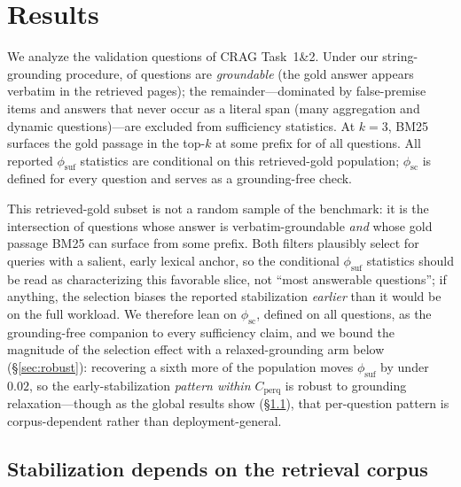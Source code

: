 \section{Results}
We analyze the \nSplitZero{} validation questions of CRAG Task~1\&2. Under our
string-grounding procedure, \nGroundPct{} of questions are \emph{groundable} (the
gold answer appears verbatim in the retrieved pages); the remainder---dominated by
false-premise items and answers that never occur as a literal span (many
aggregation and dynamic questions)---are excluded from sufficiency statistics. At
$k{=}3$, BM25 surfaces the gold passage in the top-$k$ at some prefix for
\nRetrPct{} of all questions. All reported $\phi_{\mathrm{suf}}$ statistics are
conditional on this retrieved-gold population; $\phi_{\mathrm{sc}}$ is defined for
every question and serves as a grounding-free check.

This retrieved-gold subset is not a random sample of the benchmark: it is the
intersection of questions whose answer is verbatim-groundable \emph{and} whose gold
passage BM25 can surface from some prefix. Both filters plausibly select for
queries with a salient, early lexical anchor, so the conditional
$\phi_{\mathrm{suf}}$ statistics should be read as characterizing this favorable
slice, not ``most answerable questions''; if anything, the selection biases the
reported stabilization \emph{earlier} than it would be on the full workload. We
therefore lean on $\phi_{\mathrm{sc}}$, defined on all \nSplitZero{} questions, as
the grounding-free companion to every sufficiency claim, and we bound the magnitude
of the selection effect with a relaxed-grounding arm below
(\S\ref{sec:robust}): recovering a sixth more of the population moves
$\phi_{\mathrm{suf}}$ by under $0.02$, so the early-stabilization
\emph{pattern within $C_{\mathrm{perq}}$} is robust to grounding relaxation---though
as the global results show (\S\ref{sec:corpus-dependence}), that per-question
pattern is corpus-dependent rather than deployment-general.

\subsection{Stabilization depends on the retrieval corpus}
\label{sec:corpus-dependence}

